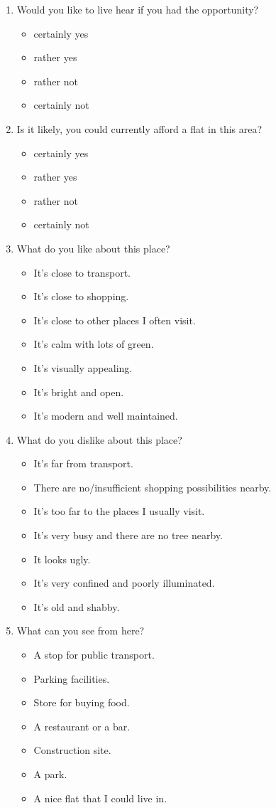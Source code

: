 \documentclass[letterpaper]{article}
\begin{document}
\begin{enumerate}
	\item Would you like to live hear if you had the opportunity?
	\begin{itemize}
		\item certainly yes
		\item rather yes
		\item rather not
		\item certainly not
	\end{itemize}
	\item Is it likely, you could currently afford a flat in this area?
	\begin{itemize}
		\item certainly yes
		\item rather yes
		\item rather not
		\item certainly not
	\end{itemize}
	\item What do you like about this place?
	\begin{itemize}
		\item It's close to transport.
		\item It's close to shopping.
		\item It's close to other places I often visit.
		\item It's calm with lots of green.
		\item It's visually appealing.
		\item It's bright and open.
		\item It's modern and well maintained.
	\end{itemize}
	\item What do you dislike about this place?
	\begin{itemize}
		\item It's far from transport.
		\item There are no/insufficient shopping possibilities nearby.
		\item It's too far to the places I usually visit.
		\item It's very busy and there are no tree nearby.
		\item It looks ugly.
		\item It's very confined and poorly illuminated.
		\item It's old and shabby.
	\end{itemize}
	\item What can you see from here?
	\begin{itemize}
		\item A stop for public transport.
		\item Parking facilities.
		\item Store for buying food.
		\item A restaurant or a bar.
		\item Construction site.
		\item A park.
		\item A nice flat that I could live in.
	\end{itemize}
\end{enumerate}
\end{document}
